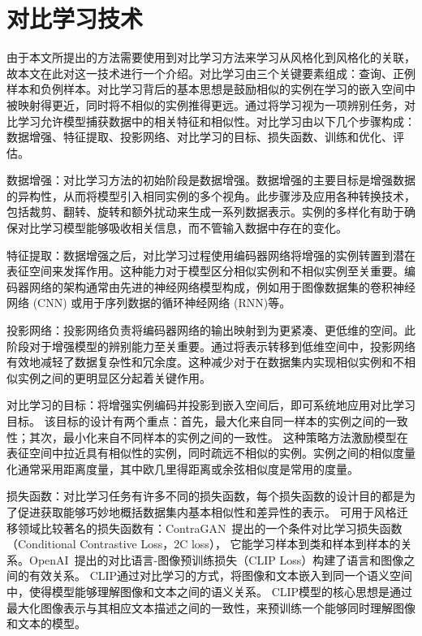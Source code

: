 \section{对比学习技术}
由于本文所提出的方法需要使用到对比学习方法来学习从风格化到风格化的关联，故本文在此对这一技术进行一个介绍。对比学习由三个关键要素组成：查询、正例样本和负例样本。对比学习背后的基本思想是鼓励相似的实例在学习的嵌入空间中被映射得更近，同时将不相似的实例推得更远。通过将学习视为一项辨别任务，对比学习允许模型捕获数据中的相关特征和相似性。对比学习由以下几个步骤构成：数据增强、特征提取、投影网络、对比学习的目标、损失函数、训练和优化、评估。
\par 数据增强：对比学习方法的初始阶段是数据增强。数据增强的主要目标是增强数据的异构性，从而将模型引入相同实例的多个视角。此步骤涉及应用各种转换技术，包括裁剪、翻转、旋转和额外扰动来生成一系列数据表示。实例的多样化有助于确保对比学习模型能够吸收相关信息，而不管输入数据中存在的变化。
\par 特征提取：数据增强之后，对比学习过程使用编码器网络将增强的实例转置到潜在表征空间来发挥作用。这种能力对于模型区分相似实例和不相似实例至关重要。编码器网络的架构通常由先进的神经网络模型构成，例如用于图像数据集的卷积神经网络 (CNN) 或用于序列数据的循环神经网络 (RNN)等。
\par 投影网络：投影网络负责将编码器网络的输出映射到为更紧凑、更低维的空间。此阶段对于增强模型的辨别能力至关重要。通过将表示转移到低维空间中，投影网络有效地减轻了数据复杂性和冗余度。这种减少对于在数据集内实现相似实例和不相似实例之间的更明显区分起着关键作用。
\par 对比学习的目标：将增强实例编码并投影到嵌入空间后，即可系统地应用对比学习目标。
该目标的设计有两个重点：首先，最大化来自同一样本的实例之间的一致性；其次，最小化来自不同样本的实例之间的一致性。
这种策略方法激励模型在表征空间中拉近具有相似性的实例，同时疏远不相似的实例。实例之间的相似度量化通常采用距离度量，其中欧几里得距离或余弦相似度是常用的度量。
\par 损失函数：对比学习任务有许多不同的损失函数，每个损失函数的设计目的都是为了促进获取能够巧妙地概括数据集内基本相似性和差异性的表示。
可用于风格迁移领域比较著名的损失函数有：ContraGAN~\cite{kang2020contragan}提出的一个条件对比学习损失函数（Conditional Contrastive Loss，2C loss），
它能学习样本到类和样本到样本的关系。OpenAI~\cite{radford2021learning}提出的对比语言-图像预训练损失（CLIP Loss）构建了语言和图像之间的有效关系。
CLIP通过对比学习的方式，将图像和文本嵌入到同一个语义空间中，使得模型能够理解图像和文本之间的语义关系。
CLIP模型的核心思想是通过最大化图像表示与其相应文本描述之间的一致性，来预训练一个能够同时理解图像和文本的模型。
